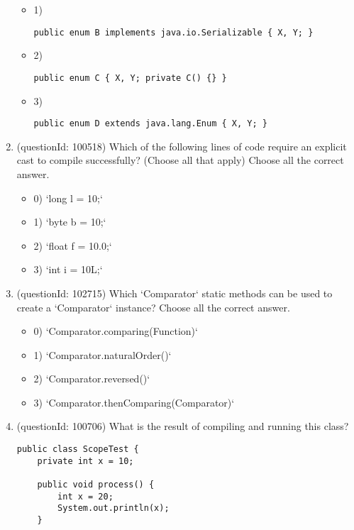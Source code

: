 \documentclass[12pt]{article}
\begin{document}
\begin{enumerate}[label=(\arabic*)]
\begin{itemize}
\item 1) \begin{verbatim}public enum B implements java.io.Serializable { X, Y; }\end{verbatim}

\item 2) \begin{verbatim}public enum C { X, Y; private C() {} }\end{verbatim}

\item 3) \begin{verbatim}public enum D extends java.lang.Enum { X, Y; }\end{verbatim}

\end{itemize}
\item (questionId: 100518) Which of the following lines of code require an explicit cast to compile successfully? (Choose all that apply)
Choose all the correct answer.\begin{itemize}
\item 0) `long l = 10;`

\item 1) `byte b = 10;`

\item 2) `float f = 10.0;`

\item 3) `int i = 10L;`

\end{itemize}
\item (questionId: 102715) Which `Comparator` static methods can be used to create a `Comparator` instance?
Choose all the correct answer.\begin{itemize}
\item 0) `Comparator.comparing(Function)`

\item 1) `Comparator.naturalOrder()`

\item 2) `Comparator.reversed()`

\item 3) `Comparator.thenComparing(Comparator)`

\end{itemize}
\item (questionId: 100706) What is the result of compiling and running this class?\n\begin{verbatim}
public class ScopeTest {
    private int x = 10;

    public void process() {
        int x = 20;
        System.out.println(x);
    }


\end{verbatim}
\end{enumerate}
\end{document}

